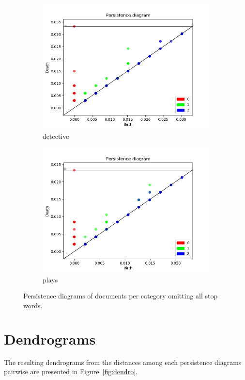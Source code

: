 \documentclass[fleqn]{article}
\begin{document}
\begin{figure}
\begin{subfigure}[t]{0.425\textwidth}
    	\includegraphics[width=\textwidth]{figures/stopwords_excluded/detective.png}
    	\caption{detective}
        \label{fig:sw:detective}
    \end{subfigure}\hfill
	\begin{subfigure}[t]{0.425\textwidth}
    	\includegraphics[width=\textwidth]{figures/stopwords_excluded/plays.png}
    	\caption{plays}
        \label{fig:sw:plays}
    \end{subfigure}\hfill
    \caption{Persistence diagrams of documents per category omitting all stop words.}
    \label{fig:sw}
\end{figure}

\section{Dendrograms} \label{app:dendro}
The resulting dendrograms from the distances among each persistence diagrams pairwise are presented in Figure~\ref{fig:dendro}.
\end{document}
